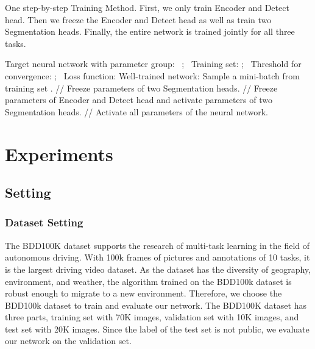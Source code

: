 \documentclass[10pt,twocolumn,letterpaper]{article}
\begin{document}
\begin{algorithm}  
    \caption{One step-by-step Training Method. First, we only train Encoder and Detect head. Then we freeze the Encoder and Detect head as well as train two Segmentation heads. Finally, the entire network is trained jointly for all three tasks.} 
    \label{algorithm:train}
    \begin{algorithmic}[1] \Require Target neural network  with parameter group:
        \Statex \quad \, ;
        \Statex \quad \, Training set: ;
        \Statex \quad \, Threshold for convergence: ;
        \Statex \quad \, Loss function: 
        \Ensure Well-trained network: 
            \Repeat
                \State Sample a mini-batch  from training set .
                \State 
                \State 
            \Until 
        \EndProcedure
        \State  // Freeze parameters of two Segmentation heads.
        \State {}
        \State  // Freeze parameters of Encoder and Detect head and activate parameters of two Segmentation heads.
        \State {}
        \State  // Activate all parameters of the neural network.
        \State {}
        \State {}
    \end{algorithmic}
\end{algorithm}





\section{Experiments}

\subsection{Setting}

\subsubsection{Dataset Setting}
The BDD100K dataset \cite{bdd100k} supports the research of multi-task learning in the field of autonomous driving. With 100k frames of pictures and annotations of 10 tasks, it is the largest driving video dataset. As the dataset has the diversity of geography, environment, and weather, the algorithm trained on the BDD100k dataset is robust enough to migrate to a new environment. Therefore, we choose the BDD100k dataset to train and evaluate our network. The BDD100K dataset has three parts, training set with 70K images, validation set with 10K images, and test set with 20K images. Since the label of the test set is not public, we evaluate our network on the validation set.
\end{document}
